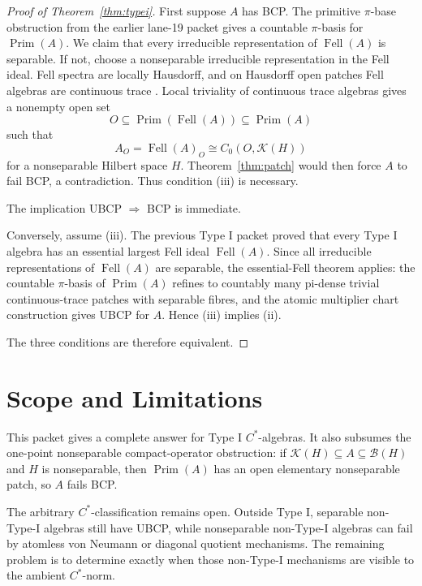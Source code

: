 \documentclass[11pt]{article}
\newcommand{\Kcal}{\mathcal K}
\newcommand{\Bcal}{\mathcal B}
\newcommand{\Prim}{\operatorname{Prim}}
\newcommand{\Fell}{\operatorname{Fell}}
\begin{document}
\begin{proof}[Proof of Theorem~\ref{thm:typei}]
First suppose \(A\) has BCP.  The primitive \(\pi\)-base obstruction from the
earlier lane-19 packet gives a countable \(\pi\)-basis for \(\Prim(A)\).
We claim that every irreducible representation of \(\Fell(A)\) is separable.
If not, choose a nonseparable irreducible representation in the Fell ideal.
Fell spectra are locally Hausdorff, and on Hausdorff open patches Fell
algebras are continuous trace \cite{CHR}.  Local triviality of continuous
trace algebras gives a nonempty open set
\[
        O\subseteq\Prim(\Fell(A))\subseteq\Prim(A)
\]
such that
\[
        A_O=\Fell(A)_O\cong C_0(O,\Kcal(H))
\]
for a nonseparable Hilbert space \(H\).  Theorem~\ref{thm:patch} would then
force \(A\) to fail BCP, a contradiction.  Thus condition (iii) is necessary.

The implication UBCP \(\Rightarrow\) BCP is immediate.

Conversely, assume (iii).  The previous Type I packet proved that every Type
I algebra has an essential largest Fell ideal \(\Fell(A)\).  Since all
irreducible representations of \(\Fell(A)\) are separable, the
essential-Fell theorem \cite{lane19essential} applies: the countable
\(\pi\)-basis of \(\Prim(A)\) refines to countably many pi-dense trivial
continuous-trace patches with separable fibres, and the atomic multiplier
chart construction gives UBCP for \(A\).  Hence (iii) implies (ii).

The three conditions are therefore equivalent.
\end{proof}

\section*{Scope and Limitations}

This packet gives a complete answer for Type I \(C^*\)-algebras.  It also
subsumes the one-point nonseparable compact-operator obstruction: if
\(\Kcal(H)\subseteq A\subseteq\Bcal(H)\) and \(H\) is nonseparable, then
\(\Prim(A)\) has an open elementary nonseparable patch, so \(A\) fails BCP.

The arbitrary \(C^*\)-classification remains open.  Outside Type I, separable
non-Type-I algebras still have UBCP, while nonseparable non-Type-I algebras
can fail by atomless von Neumann or diagonal quotient mechanisms.  The
remaining problem is to determine exactly when those non-Type-I mechanisms
are visible to the ambient \(C^*\)-norm.
\end{document}
